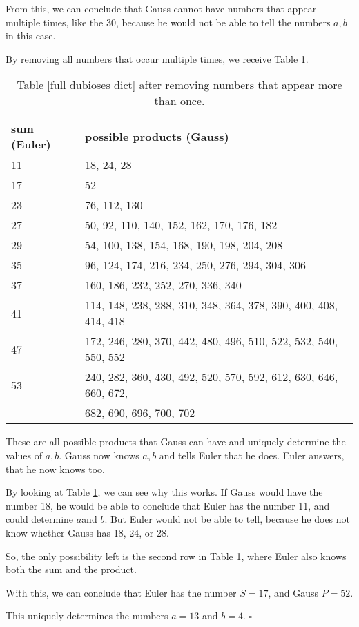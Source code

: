 \documentclass{article}
\begin{document}
From this, we can conclude that Gauss cannot have numbers that appear multiple times, like the 30, because he would not be able to tell the numbers $a,b$ in this case.

By removing all numbers that occur multiple times, we receive Table \ref{edited dubioses dict}.

\newpage 

\begin{table}[h!]
\centering
\begin{tabular}{ll}
\toprule
\textbf{sum} (Euler) & \textbf{possible products} (Gauss) \\ \toprule
11 & 18, 24, 28 \\ \midrule
17 & 52 \\ \midrule
23 & 76, 112, 130 \\ \midrule
27 & 50, 92, 110, 140, 152, 162, 170, 176, 182 \\ \midrule
29 & 54, 100, 138, 154, 168, 190, 198, 204, 208 \\ \midrule
35 & 96, 124, 174, 216, 234, 250, 276, 294, 304, 306 \\ \midrule
37 & 160, 186, 232, 252, 270, 336, 340 \\ \midrule
41 & 114, 148, 238, 288, 310, 348, 364, 378, 390, 400, 408, 414, 418 \\ \midrule
47 & 172, 246, 280, 370, 442, 480, 496, 510, 522, 532, 540, 550, 552 \\ \midrule
53 & 240, 282, 360, 430, 492, 520, 570, 592, 612, 630, 646, 660, 672, \\ & 682, 690, 696, 700, 702 \\ \bottomrule
\end{tabular}

\caption{Table \ref{full dubioses dict} after removing numbers that appear more than once.}
\label{edited dubioses dict}

\end{table}

These are all possible products that Gauss can have and uniquely determine the values of $a,b$. Gauss now knows $a,b$ and tells Euler that he does. Euler answers, that he now knows too.

By looking at Table \ref{edited dubioses dict}, we can see why this works. If Gauss would have the number 18, he would be able to conclude that Euler has the number 11, and could determine $a $and $b$. But Euler would not be able to tell, because he does not know whether Gauss has 18, 24, or 28.

So, the only possibility left is the second row in Table \ref{edited dubioses dict}, where Euler also knows both the sum and the product.

With this, we can conclude that Euler has the number $S = 17$, and Gauss $P = 52$.

This uniquely determines the numbers $a = 13$ and $b = 4$. $\square$
\end{document}
